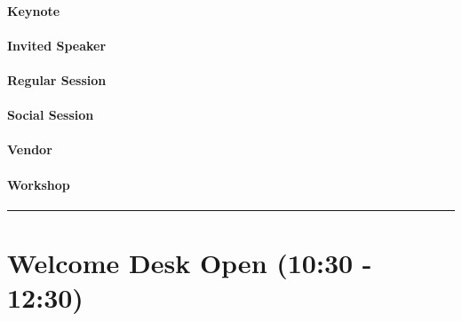\documentclass[
]{book}
\begin{document}
\begin{keynote}
\hypertarget{keynote}{%
\paragraph{Keynote}\label{keynote}}
\end{keynote}

\begin{speaker}
\hypertarget{invited-speaker}{%
\paragraph{Invited Speaker}\label{invited-speaker}}
\end{speaker}

\begin{session}
\hypertarget{regular-session}{%
\paragraph{Regular Session}\label{regular-session}}
\end{session}

\begin{social}
\hypertarget{social-session}{%
\paragraph{Social Session}\label{social-session}}
\end{social}

\begin{vendor}
\hypertarget{vendor}{%
\paragraph{Vendor}\label{vendor}}
\end{vendor}

\begin{workshop}
\hypertarget{workshop}{%
\paragraph{Workshop}\label{workshop}}
\end{workshop}

\begin{center}\rule{0.5\linewidth}{0.5pt}\end{center}

\hypertarget{welcome-desk-open-1030---1230}{%
\section*{Welcome Desk Open (10:30 - 12:30)}\label{welcome-desk-open-1030---1230}}
\end{document}
